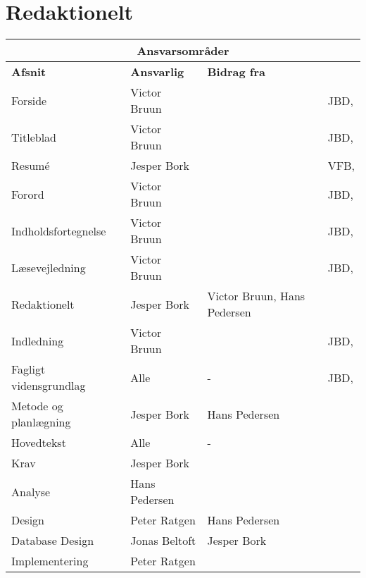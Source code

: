 \clearpage
\section{Redaktionelt}
\vfuzz=100pt
\hfuzz=100pt

\begin{table}[h!]
\centering
\label{tab:1}
    \begin{tabular}{|p{45mm}|p{26mm}|p{26mm}|p{26mm}|} \hline
    \multicolumn{4}{|c|}{\textbf{Ansvarsområder}} \\ \hline
        \textbf{Afsnit}        & \textbf{Ansvarlig} & \textbf{Bidrag fra} &\textbf{\raggedright Kontrolleret af}  \\\hline
        Forside                & Victor Bruun     &          & JBD, \\ \hline
        Titleblad              & Victor Bruun     &          & JBD, \\ \hline
        Resumé                 & Jesper Bork      &          & VFB, \\ \hline
        Forord                 & Victor Bruun     &          & JBD,  \\ \hline
        Indholdsfortegnelse    & Victor Bruun     &          & JBD, \\ \hline
        Læsevejledning         & Victor Bruun     &          & JBD,  \\ \hline
        Redaktionelt           & Jesper Bork      & Victor Bruun, Hans Pedersen         &  \\ \hline
        Indledning             & Victor Bruun     &          & JBD, \\ \hline
        Fagligt vidensgrundlag & Alle             & -        & JBD, \\ \hline
        Metode og planlægning  & Jesper Bork      & Hans Pedersen         &  \\ \hline
        Hovedtekst             & Alle             & -        &  \\ \hline
        Krav                   & Jesper Bork      &          &  \\ \hline
        Analyse                & Hans Pedersen    &              &  \\ \hline
        Design                 & Peter Ratgen     & Hans Pedersen&  \\ \hline
        Database Design        & Jonas Beltoft    & Jesper Bork  &  \\ \hline
        Implementering         & Peter Ratgen \newline 

\end{tabular}
\end{table}
